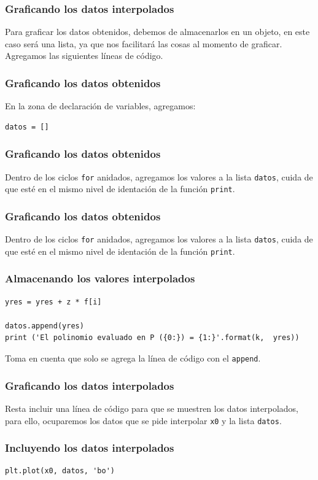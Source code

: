 \documentclass[12pt]{beamer}
\begin{document}
\begin{frame}
\frametitle{Graficando los datos interpolados}
Para graficar los datos obtenidos, debemos de almacenarlos en un objeto, \pause en este caso será una lista, ya que nos facilitará las cosas al momento de graficar.
\\
\bigskip
\pause
Agregamos las siguientes líneas de código.
\end{frame}
\begin{frame}[fragile]
\frametitle{Graficando los datos obtenidos}
En la zona de declaración de variables, agregamos:
\pause
\begin{verbatim}
datos = []
\end{verbatim}
\end{frame}
\begin{frame}
\frametitle{Graficando los datos obtenidos}
Dentro de los ciclos \texttt{for} anidados, agregamos los valores a la lista \texttt{datos}, cuida de que esté en el mismo nivel de identación de la función \texttt{print}.
\end{frame}
\begin{frame}
\frametitle{Graficando los datos obtenidos}
Dentro de los ciclos \texttt{for} anidados, agregamos los valores a la lista \texttt{datos}, cuida de que esté en el mismo nivel de identación de la función \texttt{print}.
\end{frame}
\begin{frame}[fragile]
\frametitle{Almacenando los valores interpolados}
\begin{lstlisting}[caption=Definiendo el polinomio]
    yres = yres + z * f[i] 

datos.append(yres)
print ('El polinomio evaluado en P ({0:}) = {1:}'.format(k,  yres))
\end{lstlisting}
Toma en cuenta que solo se agrega la línea de código con el \texttt{append}.
\end{frame}
\begin{frame}
\frametitle{Graficando los datos interpolados}
Resta incluir una línea de código para que se muestren los datos interpolados, para ello, ocuparemos los datos que se pide interpolar \texttt{x0} y la lista \texttt{datos}.
\end{frame}
\begin{frame}[fragile]
\frametitle{Incluyendo los datos interpolados}
\begin{lstlisting}[caption=Agregando datos con color y marca diferente]
plt.plot(x0, datos, 'bo')
\end{lstlisting}
\end{frame}
\end{document}
